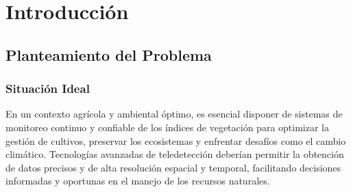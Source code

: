 
\chapter{Introducción}

\section*{Planteamiento del Problema}

\subsection*{Situación Ideal}

En un contexto agrícola y ambiental óptimo, es esencial disponer de sistemas de monitoreo continuo y confiable de los índices de vegetación para optimizar la gestión de cultivos, preservar los ecosistemas y enfrentar desafíos como el cambio climático. Tecnologías avanzadas de teledetección deberían permitir la obtención de datos precisos y de alta resolución espacial y temporal, facilitando decisiones informadas y oportunas en el manejo de los recursos naturales.

